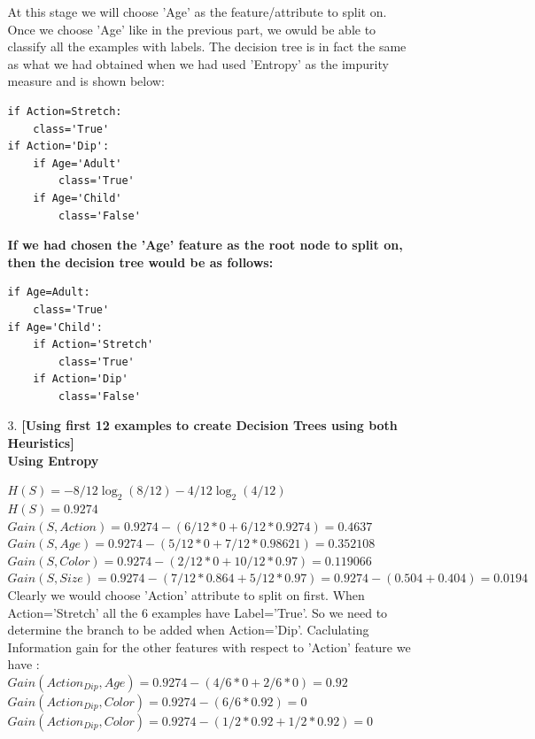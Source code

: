 \documentclass[11pt]{article}
\begin{document}
\begin{enumerate}
\begin{enumerate}
			At this stage we will choose 'Age' as the feature/attribute to split on. Once we choose 'Age' like in the previous part, we owuld be able to classify all the examples with labels. The decision tree is in fact the same as what we had obtained when we had used 'Entropy' as the impurity measure and is shown below:
			
			
\begin{lstlisting}
if Action=Stretch:
	class='True'
if Action='Dip':
	if Age='Adult'
		class='True'
	if Age='Child'
		class='False'		
\end{lstlisting}
			
			\textbf{If we had chosen the 'Age' feature as the root node to split on, then the decision tree would be as follows:}
\begin{lstlisting}
if Age=Adult:
	class='True'
if Age='Child':
	if Action='Stretch'
		class='True'
	if Action='Dip'
		class='False'		
\end{lstlisting}
			
		\item[3.] \textbf{[Using first 12 examples to create Decision Trees using both Heuristics]} 	\\
		
		\textbf{ Using Entropy}
		
		$H(S)=-8/12 \log_2{(8/12)} -4/12\log_2{(4/12)}$\\
		$H(S)=0.9274$\\
		
		$Gain(S,Action)=0.9274 -	(6/12 *0 +6/12 * 0.9274)=0.4637$\\
		$Gain(S,Age)=0.9274 -	(5/12 *0 +7/12 * 0.98621)=0.352108$\\
		$Gain(S,Color)=0.9274 -	(2/12 *0 +10/12 * 0.97)=0.119066$\\
		$Gain(S,Size)=0.9274 -	(7/12 *0.864 +5/12 * 0.97)=0.9274-(0.504+0.404)=0.0194$\\
		
		Clearly we would choose 'Action' attribute to split on first. When Action='Stretch' all the 6 examples have Label='True'. So we need to determine the branch to be added when Action='Dip'. Caclulating Information gain for the other features with respect to 'Action' feature we have : \\
		
		$Gain(Action_{Dip},Age)=0.9274 -	(4/6 *0 +2/6 * 0 )=0.92$\\
		$Gain(Action_{Dip},Color)=0.9274 -	(6/6 *0.92)=0$\\
		$Gain(Action_{Dip},Color)=0.9274 -	(1/2 *0.92 + 1/2 * 0.92)=0$\\
		

\end{enumerate}
\end{enumerate}
\end{document}
